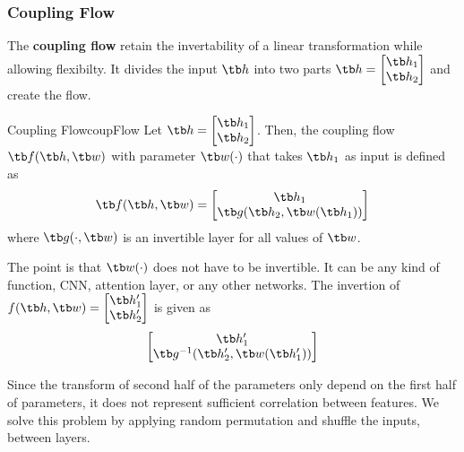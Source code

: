 \documentclass{article}
\begin{document}
        \subsubsection{Coupling Flow}
            The \textbf{coupling flow} retain the invertability of a linear transformation while allowing flexibilty.
            It divides the input $\tb h$ into two parts $\tb h = \begin{bmatrix}\tb h_1 \\ \tb h_2\end{bmatrix}$ and create the flow.
            \begin{defn}{Coupling Flow}{coupFlow}
                Let $\tb h=\begin{bmatrix} \tb h_1 \\ \tb h_2 \end{bmatrix}$. Then, the coupling flow $\tb f(\tb h, \tb w)$ with parameter $\tb w(\cdot)$
                that takes $\tb h_1$ as input is defined as
                \[
                    \tb f(\tb h, \tb w) =
                    \begin{bmatrix}
                        \tb h_1 \\
                        \tb g(\tb h_2, \tb w(\tb h_1))
                    \end{bmatrix}
                \]
                where $\tb g(\cdot, \tb w)$ is an invertible layer for all values of $\tb w$.
            \end{defn}
            
            The point is that $\tb w(\cdot)$ does not have to be invertible. It can be any kind of function, CNN, attention layer, or any other networks.
            The invertion of $f(\tb h, \tb w)=\begin{bmatrix} \tb h_1' \\ \tb h_2' \end{bmatrix}$ is given as
            \[
                \begin{bmatrix}
                    \tb h_1' \\
                    \tb g^{-1}(\tb h_2',\tb w(\tb h_1'))
                \end{bmatrix}
            \]

            Since the transform of second half of the parameters only depend on the first half of parameters, it does not represent sufficient correlation between
            features. We solve this problem by applying random permutation and shuffle the inputs, between layers.
\end{document}
